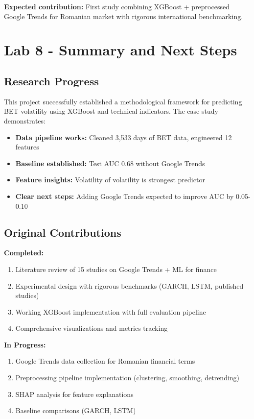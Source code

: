 \documentclass[12pt,a4paper]{article}
\begin{document}
\textbf{Expected contribution:} First study combining XGBoost + preprocessed Google Trends for Romanian market with rigorous international benchmarking.

\newpage
\section{Lab 8 - Summary and Next Steps}

\subsection{Research Progress}

This project successfully established a methodological framework for predicting BET volatility using XGBoost and technical indicators. The case study demonstrates:

\begin{itemize}
    \item \textbf{Data pipeline works:} Cleaned 3,533 days of BET data, engineered 12 features
    \item \textbf{Baseline established:} Test AUC 0.68 without Google Trends
    \item \textbf{Feature insights:} Volatility of volatility is strongest predictor
    \item \textbf{Clear next steps:} Adding Google Trends expected to improve AUC by 0.05-0.10
\end{itemize}

\subsection{Original Contributions}

\textbf{Completed:}
\begin{enumerate}
    \item Literature review of 15 studies on Google Trends + ML for finance
    \item Experimental design with rigorous benchmarks (GARCH, LSTM, published studies)
    \item Working XGBoost implementation with full evaluation pipeline
    \item Comprehensive visualizations and metrics tracking
\end{enumerate}

\textbf{In Progress:}
\begin{enumerate}
    \item Google Trends data collection for Romanian financial terms
    \item Preprocessing pipeline implementation (clustering, smoothing, detrending)
    \item SHAP analysis for feature explanations
    \item Baseline comparisons (GARCH, LSTM)
\end{enumerate}
\end{document}

